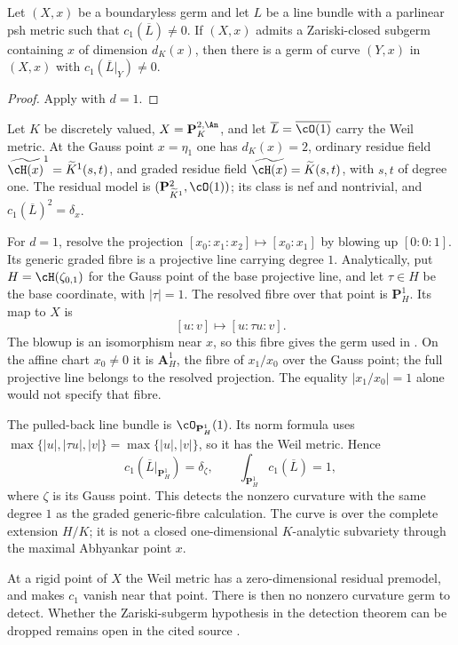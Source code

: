 \begin{corollary}
\label{cor:ch17-curve-test}
Let $(X,x)$ be a boundaryless germ and let $L$ be a line bundle with a
parlinear psh metric such that $c_1(\overline L)\ne0$.  If $(X,x)$
admits a Zariski-closed subgerm containing $x$ of dimension $d_K(x)$,
then there is a germ of curve $(Y,x)$ in $(X,x)$ with $c_1(\overline L|_Y)\ne0$.
\end{corollary}

\begin{proof}
Apply  with $d=1$.
\end{proof}

\begin{example}
\label{ex:ch17-detection-computed}
Let $K$ be discretely valued, $X=\mathbf P^{2,\An}_K$, and let
$\overline L=\overline{\cO(1)}$ carry the Weil metric.  At the Gauss
point $x=\eta_1$ one has $d_K(x)=2$, ordinary residue field
$\widetilde{\cH(x)}^1=\widetilde K^1(s,t)$, and graded residue field
$\widetilde{\cH(x)}=\widetilde K(s,t)$, with $s,t$ of degree one.
The residual model is $(\mathbf P^2_{\widetilde K^1},\cO(1))$;
its class is nef and nontrivial, and
$c_1(\overline L)^2=\delta_x$.

For $d=1$, resolve the projection $[x_0:x_1:x_2]\mapsto[x_0:x_1]$
by blowing up $[0:0:1]$.  Its generic graded fibre is a projective
line carrying degree $1$.  Analytically, put
$H=\cH(\zeta_{0,1})$ for the Gauss point of the base projective line,
and let $\tau\in H$ be the base coordinate, with $|\tau|=1$.
The resolved fibre over that point is $\mathbf P^1_H$.  Its map to $X$
is
\[
       [u:v]\longmapsto[u:\tau u:v].
\]
The blowup is an isomorphism near $x$, so this fibre gives the germ
used in .  On the affine chart
$x_0\ne0$ it is $\mathbf A^1_H$, the fibre of $x_1/x_0$ over the
Gauss point; the full projective line belongs to the resolved projection.
The equality $|x_1/x_0|=1$ alone would not specify that fibre.

The pulled-back line bundle is $\cO_{\mathbf P^1_H}(1)$.  Its norm
formula uses
$\max\{|u|,|\tau u|,|v|\}=\max\{|u|,|v|\}$, so it has the Weil
metric.  Hence
\[
       c_1(\overline L|_{\mathbf P^1_H})=\delta_\zeta,
       \qquad \int_{\mathbf P^1_H}c_1(\overline L)=1,
\]
where $\zeta$ is its Gauss point.  This detects the nonzero curvature
with the same degree $1$ as the graded generic-fibre calculation.
The curve is over the complete extension $H/K$; it is not a closed
one-dimensional $K$-analytic subvariety through the maximal Abhyankar
point $x$.

At a rigid point of $X$ the Weil metric has a zero-dimensional residual
premodel, and  makes $c_1$ vanish
near that point.  There is then no nonzero curvature germ to detect.
Whether the Zariski-subgerm hypothesis in the detection theorem can be
dropped remains open in the cited source
\cite[Remark~18.9.6]{CLD25}.
\end{example}

